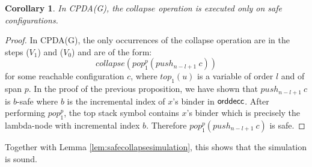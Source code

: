 \documentclass{article}
\newtheorem{corollary}[theorem]{Corollary}
\theoremstyle{remark}
\theoremstyle{definition}
\newcommand\orddec{\sf orddec}
\begin{document}
\begin{corollary}
In CPDA(G), the $collapse$ operation is executed only on safe configurations.
\end{corollary}
\begin{proof}
In CPDA(G), the only occurrences of the collapse operation are in the steps ($V_1$) and ($V_0$) and are of the form:
$$ collapse(pop_1^p(push_{n-l+1}~c))$$
for some reachable configuration $c$, where $top_1(u)$ is a variable of order $l$ and of span $p$. In the proof of the previous proposition, we have shown that
$push_{n-l+1}~c$ is $b$-safe where $b$ is the incremental index of $x$'s binder in $\orddec{c}$. After performing $pop_1^p$, the top stack symbol contains $x$'s
binder which is precisely the lambda-node with incremental index $b$. Therefore $pop^p_1(push_{n-l+1}~c)$ is safe.
\end{proof}

Together with Lemma \ref{lem:safecollapsesimulation}, this shows that the simulation is sound.
\end{document}
